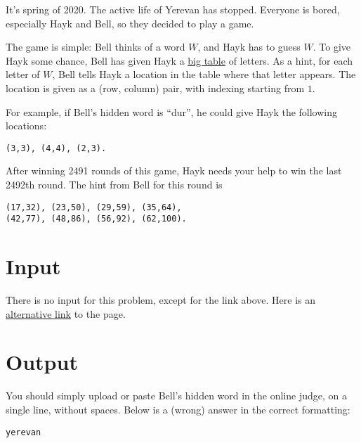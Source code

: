 It's spring of 2020.
The active life of Yerevan has stopped.
Everyone is bored, especially Hayk and Bell, so they decided to play a game.

The game is simple: Bell thinks of a word $W$, and Hayk has to guess $W$.
To give Hayk some chance, Bell has given Hayk a \href{http://ejudge.rau.am/ejudge/hayktable.html}{big table} of letters.
As a hint, for each letter of $W$, Bell tells Hayk a location in the table where that letter appears.
The location is given as a (row, column) pair, with indexing starting from $1$.

For example, if Bell's hidden word is ``dur'', he could give Hayk the following locations:
\begin{center}
    \texttt{(3,3), (4,4), (2,3).}
\end{center}

After winning 2491 rounds of this game, Hayk needs your help to win the last 2492th round.
The hint from Bell for this round is
\begin{center}
    \texttt{(17,32), (23,50), (29,59), (35,64),\\
            (42,77), (48,86), (56,92), (62,100).}
\end{center}

\section*{Input}
There is no input for this problem, except for the link above.
Here is an \href{http://167.71.248.201/ejudge/hayktable.html}{alternative link} to the page.

\section*{Output}
You should simply upload or paste Bell's hidden word in the online judge, on a single line, without spaces.
Below is a (wrong) answer in the correct formatting:
\begin{center}
    \texttt{yerevan}
\end{center}
